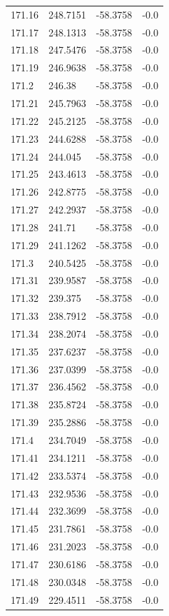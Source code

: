 \begin{table}[H]
\begin{tabular}{llll}
171.16 & 248.7151 & -58.3758 & -0.0 \\
171.17 & 248.1313 & -58.3758 & -0.0 \\
171.18 & 247.5476 & -58.3758 & -0.0 \\
171.19 & 246.9638 & -58.3758 & -0.0 \\
171.2 & 246.38 & -58.3758 & -0.0 \\
171.21 & 245.7963 & -58.3758 & -0.0 \\
171.22 & 245.2125 & -58.3758 & -0.0 \\
171.23 & 244.6288 & -58.3758 & -0.0 \\
171.24 & 244.045 & -58.3758 & -0.0 \\
171.25 & 243.4613 & -58.3758 & -0.0 \\
171.26 & 242.8775 & -58.3758 & -0.0 \\
171.27 & 242.2937 & -58.3758 & -0.0 \\
171.28 & 241.71 & -58.3758 & -0.0 \\
171.29 & 241.1262 & -58.3758 & -0.0 \\
171.3 & 240.5425 & -58.3758 & -0.0 \\
171.31 & 239.9587 & -58.3758 & -0.0 \\
171.32 & 239.375 & -58.3758 & -0.0 \\
171.33 & 238.7912 & -58.3758 & -0.0 \\
171.34 & 238.2074 & -58.3758 & -0.0 \\
171.35 & 237.6237 & -58.3758 & -0.0 \\
171.36 & 237.0399 & -58.3758 & -0.0 \\
171.37 & 236.4562 & -58.3758 & -0.0 \\
171.38 & 235.8724 & -58.3758 & -0.0 \\
171.39 & 235.2886 & -58.3758 & -0.0 \\
171.4 & 234.7049 & -58.3758 & -0.0 \\
171.41 & 234.1211 & -58.3758 & -0.0 \\
171.42 & 233.5374 & -58.3758 & -0.0 \\
171.43 & 232.9536 & -58.3758 & -0.0 \\
171.44 & 232.3699 & -58.3758 & -0.0 \\
171.45 & 231.7861 & -58.3758 & -0.0 \\
171.46 & 231.2023 & -58.3758 & -0.0 \\
171.47 & 230.6186 & -58.3758 & -0.0 \\
171.48 & 230.0348 & -58.3758 & -0.0 \\
171.49 & 229.4511 & -58.3758 & -0.0 \\

\end{tabular}
\end{table}
